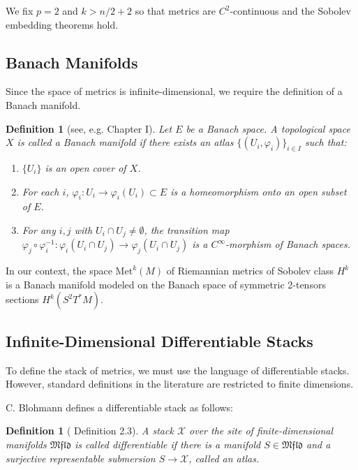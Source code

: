 \documentclass[11pt]{article}
\newtheorem{definition}[theorem]{Definition}
\newcommand{\Met}{\mathrm{Met}}
\begin{document}
We fix $p=2$ and $k > n/2 + 2$ so that metrics are $C^2$-continuous and the Sobolev embedding theorems hold.

\subsection*{Banach Manifolds}

Since the space of metrics is infinite-dimensional, we require the definition of a Banach manifold. 

\begin{definition}[see, e.g. \cite{Ban16} Chapter I]
Let $E$ be a Banach space. A topological space $X$ is called a Banach manifold if there exists an atlas $\{(U_i, \varphi_i)\}_{i \in I}$ such that:
\begin{enumerate}
    \item $\{U_i\}$ is an open cover of $X$.
    \item For each $i$, $\varphi_i: U_i \longrightarrow\varphi_i(U_i) \subset E$ is a homeomorphism onto an open subset of $E$.
    \item For any $i, j$ with $U_i \cap U_j \neq \emptyset$, the transition map $\varphi_j \circ \varphi_i^{-1}: \varphi_i(U_i \cap U_j) \longrightarrow\varphi_j(U_i \cap U_j)$ is a $C^\infty$-morphism of Banach spaces.
\end{enumerate}
\end{definition}

In our context, the space $\Met^k(M)$ of Riemannian metrics of Sobolev class $H^k$ is a Banach manifold modeled on the Banach space of symmetric 2-tensors sections $H^k(S^2 T^*M)$.

\subsection*{Infinite-Dimensional Differentiable Stacks}

To define the stack of metrics, we must use the language of differentiable stacks. However, standard definitions in the literature are restricted to finite dimensions.

C. Blohmann defines a differentiable stack as follows:

\begin{definition}[\cite{Blo08} Definition 2.3]
A stack $\mathcal{X}$ over the site of finite-dimensional manifolds $\mathfrak{Mfld}$ is called differentiable if there is a manifold $S \in \mathfrak{Mfld}$ and a surjective representable submersion $S \longrightarrow\mathcal{X}$, called an atlas.
\end{definition}
\end{document}
